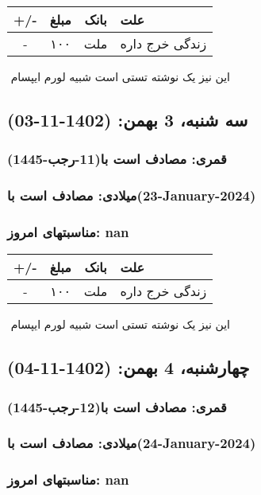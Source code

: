 \documentclass{article}
\newcommand{\rnote}[1]{\marginpar{\textcolor{color}{\StrSubstitute{\##1}{ }{\_}}}}
\newcommand{\myRow}[4]{
    #1 & #2 & #3 & #4 \\ \hline
}
\begin{document}
\begin{tabular}{ | c | c | c | p{5cm} |}
    \hline
    \myRow{ +/- }{مبلغ}{بانک}{علت}
    \myRow{-}{۱۰۰}{ملت}{زندگی خرج داره}
\end{tabular}
\newline
\newline

‌
\rnote{تست}
این نیز یک نوشته تستی است شبیه لورم ایپسام




\newpage
{}
\textcolor{color}{
\section{ سه شنبه، 3 بهمن: (1402-11-03) }
\subsubsection*{قمری: مصادف است با(11-رجب-1445)} 
\subsubsection*{میلادی: مصادف است با(23-January-2024)}
\subsubsection*{مناسبتهای امروز: nan}
}


\begin{tabular}{ | c | c | c | p{5cm} |}
    \hline
    \myRow{ +/- }{مبلغ}{بانک}{علت}
    \myRow{-}{۱۰۰}{ملت}{زندگی خرج داره}
\end{tabular}
\newline
\newline

‌
\rnote{تست}
این نیز یک نوشته تستی است شبیه لورم ایپسام




\newpage
{}
\textcolor{color}{
\section{ چهارشنبه، 4 بهمن: (1402-11-04) }
\subsubsection*{قمری: مصادف است با(12-رجب-1445)} 
\subsubsection*{میلادی: مصادف است با(24-January-2024)}
\subsubsection*{مناسبتهای امروز: nan}
}
\end{document}
